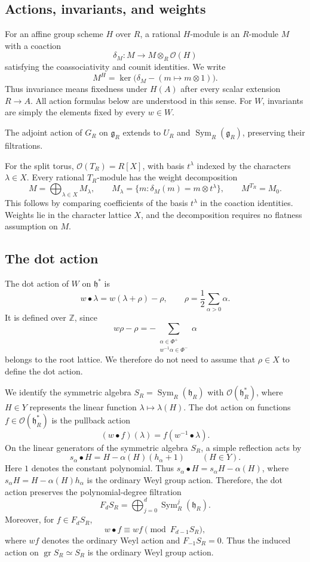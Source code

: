 \documentclass[twoside,a4paper,12pt,reqno]{amsart}
\theoremstyle{remark}
\numberwithin{equation}{section}
\newcommand{\Z}{\mathbb Z}
\newcommand{\cO}{\mathcal O}
\newcommand{\fg}{\mathfrak g}
\newcommand{\fh}{\mathfrak h}
\DeclareMathOperator{\Sym}{Sym}
\DeclareMathOperator{\gr}{gr}
\begin{document}
\subsection{Actions, invariants, and weights}\label{subsec:actions}

For an affine group scheme \(H\) over \(R\), a rational \(H\)-module
is an \(R\)-module \(M\) with a coaction
\[
\delta_M:M\longrightarrow M\otimes_R\cO(H)
\]
satisfying the coassociativity and counit identities. We write
\[
M^H=\ker\bigl(\delta_M-(m\mapsto m\otimes1)\bigr).
\]
Thus invariance means fixedness under \(H(A)\) after every scalar
extension \(R\to A\). All action formulas below are understood in this
sense. For \(W\), invariants are simply the elements fixed by every
\(w\in W\).

The adjoint action of \(G_R\) on \(\fg_R\) extends to \(U_R\) and
\(\Sym_R(\fg_R)\), preserving their filtrations.

For the split torus, \(\cO(T_R)=R[X]\), with basis \(t^\lambda\)
indexed by the characters \(\lambda\in X\). Every rational
\(T_R\)-module has the weight decomposition
\begin{equation}\label{eq:weights}
M=\bigoplus_{\lambda\in X}M_\lambda,\qquad
M_\lambda=\{m:\delta_M(m)=m\otimes t^\lambda\},\qquad
M^{T_R}=M_0.
\end{equation}
This follows by comparing coefficients of the basis \(t^\lambda\) in
the coaction identities. Weights lie in the character lattice \(X\),
and the decomposition requires no flatness assumption on \(M\).

\subsection{The dot action}

The dot action of \(W\) on \(\fh^*\) is
\[
w\bullet\lambda=w(\lambda+\rho)-\rho,
\qquad
\rho=\frac12\sum_{\alpha>0}\alpha.
\]
It is defined over \(\Z\), since
\[
w\rho-\rho
=-\sum_{\substack{\alpha\in\Phi^+\\w^{-1}\alpha\in\Phi^-}}\alpha
\]
belongs to the root lattice. We therefore do not need to assume that \(\rho\in X\) to define the dot action.

We identify the symmetric algebra \(S_R=\Sym_R(\fh_R)\) with \(\cO(\fh_R^*)\), where \(H\in Y\) represents the linear function \(\lambda\mapsto\lambda(H)\). The dot action on functions \(f\in\cO(\fh_R^*)\) is the pullback action
\[
(w\bullet f)(\lambda)=f(w^{-1}\bullet\lambda).
\]
On the linear generators of the symmetric algebra \(S_R\), a simple reflection acts by
\begin{equation}\label{eq:dot}
s_\alpha\bullet H=H-\alpha(H)(h_\alpha+1)
\qquad(H\in Y).
\end{equation}
Here \(1\) denotes the constant polynomial. Thus \(s_\alpha\bullet H=s_\alpha H-\alpha(H)\), where \(s_\alpha H=H-\alpha(H)h_\alpha\) is the ordinary Weyl group action. Therefore, the dot action preserves the polynomial-degree filtration
\[
F_dS_R=\bigoplus_{j=0}^d\Sym_R^j(\fh_R).
\]
Moreover, for \(f\in F_dS_R\),
\[
w\bullet f\equiv wf\pmod{F_{d-1}S_R},
\]
where \(wf\) denotes the ordinary Weyl action and \(F_{-1}S_R=0\). Thus the induced action on \(\gr S_R\simeq S_R\) is the ordinary Weyl group action.
\end{document}
